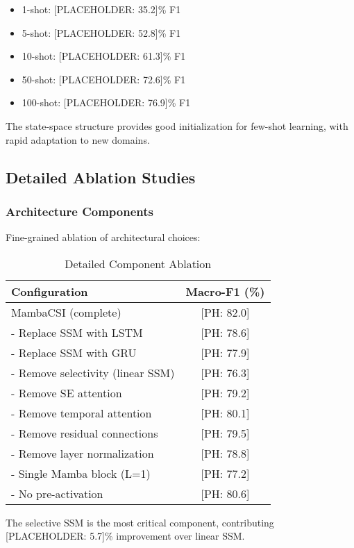 \documentclass[journal]{IEEEtran}
\begin{document}
\begin{itemize}
\item 1-shot: [PLACEHOLDER: 35.2]\% F1
\item 5-shot: [PLACEHOLDER: 52.8]\% F1
\item 10-shot: [PLACEHOLDER: 61.3]\% F1
\item 50-shot: [PLACEHOLDER: 72.6]\% F1
\item 100-shot: [PLACEHOLDER: 76.9]\% F1
\end{itemize}

The state-space structure provides good initialization for few-shot learning, with rapid adaptation to new domains.

\subsection{Detailed Ablation Studies}

\subsubsection{Architecture Components}
Fine-grained ablation of architectural choices:

\begin{table}[h]
\centering
\caption{Detailed Component Ablation}
\begin{tabular}{lc}
\toprule
Configuration & Macro-F1 (\%) \\
\midrule
MambaCSI (complete) & [PH: 82.0] \\
- Replace SSM with LSTM & [PH: 78.6] \\
- Replace SSM with GRU & [PH: 77.9] \\
- Remove selectivity (linear SSM) & [PH: 76.3] \\
- Remove SE attention & [PH: 79.2] \\
- Remove temporal attention & [PH: 80.1] \\
- Remove residual connections & [PH: 79.5] \\
- Remove layer normalization & [PH: 78.8] \\
- Single Mamba block (L=1) & [PH: 77.2] \\
- No pre-activation & [PH: 80.6] \\
\bottomrule
\end{tabular}
\end{table}

The selective SSM is the most critical component, contributing [PLACEHOLDER: 5.7]\% improvement over linear SSM.
\end{document}
